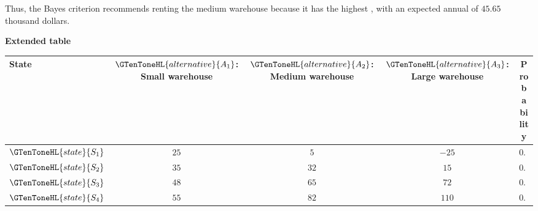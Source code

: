 	Thus, the Bayes criterion recommends renting the medium warehouse because
	it has the highest   , with an expected annual 
	of $45.65$ thousand dollars.
	
	
	\textbf{Extended  table}
	
	\begin{center}
		\normalsize
		\renewcommand{\arraystretch}{1.5}
		\setlength{\tabcolsep}{3pt}
		
		\begin{tabular}{l|c|c|c|c}
			\toprule
			State
			& $\GTenToneHL{alternative}{A_1}$: Small warehouse
			& $\GTenToneHL{alternative}{A_2}$: Medium warehouse
			& $\GTenToneHL{alternative}{A_3}$: Large warehouse
			& Probability
			\\
			\midrule
			
			$\GTenToneHL{state}{S_1}$
			& $25$
			& $5$
			& $-25$
			& $0.2$
			\\
			
			$\GTenToneHL{state}{S_2}$
			& $35$
			& $32$
			& $15$
			& $0.3$
			\\
			
			$\GTenToneHL{state}{S_3}$
			& $48$
			& $65$
			& $72$
			& $0.35$
			\\
			
			$\GTenToneHL{state}{S_4}$
			& $55$
			& $82$
			& $110$
			& $0.15$
			\\
			
			\midrule
			

\end{tabular}
\end{center}
